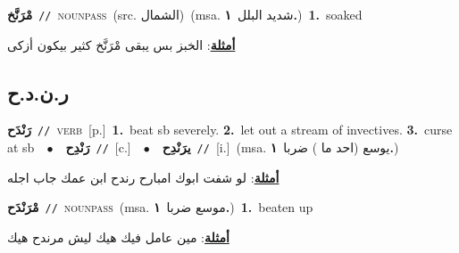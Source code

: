 \documentclass[10pt,a4paper,twoside]{article} %
\begin{document}
\begin{multicols}{2}
{\setlength\topsep{0pt}\textbf{\foreignlanguage{arabic}{مْرَنَّخ}}\ {\color{gray}\texttt{//}\color{black}}\ \textsc{noun\textunderscore pass}\ (src. \color{gray}\foreignlanguage{arabic}{الشمال}\color{black})\ \color{gray}(msa. \foreignlanguage{arabic}{شديد البلل}~\foreignlanguage{arabic}{\textbf{١.}})\color{black}\ \textbf{1.}~soaked\  \begin{flushright}\color{gray}\foreignlanguage{arabic}{\textbf{\underline{\foreignlanguage{arabic}{أمثلة}}}: الخبز بس يبقى مْرَنَّخ كثير بيكون أزكى}\end{flushright}\color{black}} \vspace{2mm}

\vspace{-3mm}
\subsection*{\color{blue}\foreignlanguage{arabic}{ر.ن.د.ح}\color{blue}{}} 

{\setlength\topsep{0pt}\textbf{\foreignlanguage{arabic}{رَنْدَح}}\ {\color{gray}\texttt{//}\color{black}}\ \textsc{verb}\ [p.]\ \textbf{1.}~beat sb severely.  \textbf{2.}~let out a stream of invectives.  \textbf{3.}~curse at sb\ \ $\bullet$\ \ \setlength\topsep{0pt}\textbf{\foreignlanguage{arabic}{رَنْدِح}}\ {\color{gray}\texttt{//}\color{black}}\ [c.]\ \ $\bullet$\ \ \setlength\topsep{0pt}\textbf{\foreignlanguage{arabic}{يرَنْدِح}}\ {\color{gray}\texttt{//}\color{black}}\ [i.]\ \color{gray}(msa. \foreignlanguage{arabic}{يوسع (احد ما ) ضربا}~\foreignlanguage{arabic}{\textbf{١.}})\color{black}\  \begin{flushright}\color{gray}\foreignlanguage{arabic}{\textbf{\underline{\foreignlanguage{arabic}{أمثلة}}}: لو شفت ابوك امبارح رندح ابن عمك جاب اجله}\end{flushright}\color{black}} \vspace{2mm}

{\setlength\topsep{0pt}\textbf{\foreignlanguage{arabic}{مْرَنْدَح}}\ {\color{gray}\texttt{//}\color{black}}\ \textsc{noun\textunderscore pass}\ \color{gray}(msa. \foreignlanguage{arabic}{موسع ضربا}~\foreignlanguage{arabic}{\textbf{١.}})\color{black}\ \textbf{1.}~beaten up\  \begin{flushright}\color{gray}\foreignlanguage{arabic}{\textbf{\underline{\foreignlanguage{arabic}{أمثلة}}}: مين عامل فيك هيك ليش مرندح هيك}\end{flushright}\color{black}} \vspace{2mm}


\end{multicols}
\end{document}
